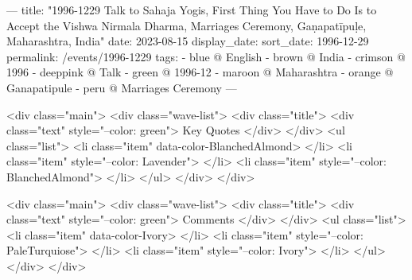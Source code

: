 ---
title: "1996-1229 Talk to Sahaja Yogis, First Thing You Have to Do Is to Accept the Vishwa Nirmala Dharma, Marriages Ceremony, Gaṇapatīpuḷe, Maharashtra, India"
date: 2023-08-15
display_date: 
sort_date: 1996-12-29
permalink: /events/1996-1229
tags:
  - blue @ English
  - brown @ India
  - crimson @ 1996
  - deeppink @ Talk
  - green @ 1996-12
  - maroon @ Maharashtra
  - orange @ Ganapatipule
  - peru @ Marriages Ceremony
---

<div class="main">
  <div class="wave-list">
    <div class="title">
      <div class="text" style="--color: green">
        Key Quotes
      </div>
    </div>
    <ul class="list">
        <li class="item" data-color-BlanchedAlmond>
        </li>
        <li class="item" style="--color: Lavender">
        </li>
        <li class="item" style="--color: BlanchedAlmond">
        </li>
      </ul>
  </div>
</div>

<div class="main">
  <div class="wave-list">
    <div class="title">
      <div class="text" style="--color: green">
        Comments
      </div>
    </div>
    <ul class="list">
        <li class="item" data-color-Ivory>
        </li>
        <li class="item" style="--color: PaleTurquiose">
        </li>
        <li class="item" style="--color: Ivory">
        </li>
      </ul>
  </div>
</div>